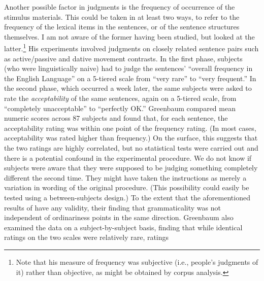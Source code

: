 Another possible factor in judgments is the frequency of occurrence of the stimulus materials. This could be taken in at least two ways, to refer to the frequency of the lexical items in the sentences, or of the sentence structures themselves. I am not aware of the former having been studied, but \citet{Greenbaum1976b,Greenbaum1977b} looked at the latter.\footnote{Note that his measure of frequency was subjective (i.e., people's judgments of it) rather than objective, as might be obtained by corpus analysis.
}
His experiments involved judgments on closely related sentence pairs such as active/passive and dative movement contrasts. In the first phase, subjects (who were linguistically naive) had to judge the sentences' ``overall frequency in the English Language'' on a 5-tiered scale from ``very rare'' to ``very frequent.'' In the second phase, which occurred a week later, the same subjects were asked to rate the \textit{acceptability} of the same sentences, again on a 5-tiered scale, from ``completely unacceptable'' to ``perfectly OK.'' Greenbaum compared mean numeric scores across 87 subjects and found that, for each sentence, the acceptability rating was within one point of the frequency rating. (In most cases, acceptability was rated higher than frequency.) On the surface, this suggests that the two ratings are highly correlated, but no statistical tests were carried out and there is a potential confound in the experimental procedure. We do not know if subjects were aware that they were supposed to be judging something completely different the second time. They might have taken the instructions as merely a variation in wording of the original procedure. (This possibility could easily be tested using a between-subjects design.) To the extent that the aforementioned results of  \citet{VetterEtAl1979} have any validity, their finding that grammaticality was not independent of ordinariness points in the same direction. Greenbaum also examined the data on a subject-by-subject basis, finding that while identical ratings on the two scales were relatively rare, ratings

